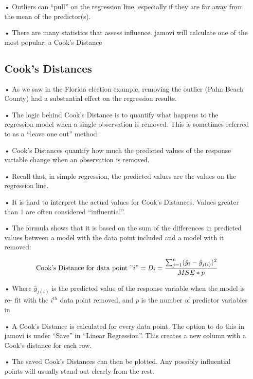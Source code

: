 \documentclass[
  letterpaper,
  DIV=11,
  numbers=noendperiod]{scrreprt}
\begin{document}
• Outliers can ``pull'' on the regression line, especially if they are
far away from the mean of the predictor(s).

• There are many statistics that assess influence. jamovi will calculate
one of the most popular: a Cook's Distance

\hypertarget{cooks-distances}{%
\subsection{Cook's Distances}\label{cooks-distances}}

• As we saw in the Florida election example, removing the outlier (Palm
Beach County) had a substantial effect on the regression results.

• The logic behind Cook's Distance is to quantify what happens to the
regression model when a single observation is removed. This is sometimes
referred to as a ``leave one out'' method.

• Cook's Distances quantify how much the predicted values of the
response variable change when an observation is removed.

• Recall that, in simple regression, the predicted values are the values
on the regression line.

• It is hard to interpret the actual values for Cook's Distances. Values
greater than 1 are often considered ``influential''.

• The formula shows that it is based on the sum of the differences in
predicted values between a model with the data point included and a
model with it removed:

\[
\text{Cook's Distance for data point } "i" = D_i = \frac{\sum^n_{j=1}(\hat{y}_i - \hat{y}_{j(i)})^2}{MSE * p}
\]

• Where \(\hat{y}_{j(i)}\) is the predicted value of the response
variable when the model is re- fit with the \(i^{th}\) data point
removed, and \(p\) is the number of predictor variables in

• A Cook's Distance is calculated for every data point. The option to do
this in jamovi is under ``Save'' in ``Linear Regression''. This creates
a new column with a Cook's distance for each row.

• The saved Cook's Distances can then be plotted. Any possibly
influential points will usually stand out clearly from the rest.
\end{document}
